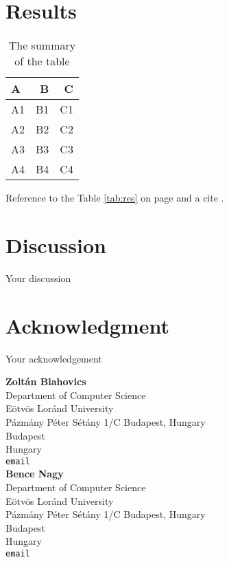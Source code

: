 \documentclass[10pt,leqno,twoside]{article}
\begin{document}
\section{Results}
\begin{table}[ht]
\centering
\begin{tabular}{lrr}
\toprule
A & B & C \\
\midrule
A1 & B1 & C1\\
A2 & B2 & C2\\
A3 & B3 & C3\\
A4 & B4 & C4\\
\bottomrule
\end{tabular}
\caption{\label{tab:train}The summary of the table}
\end{table}

Reference to the Table \ref{tab:res} on page \pageref{tab:res} and a cite \cite{reversing}.



\section{Discussion} %
Your discussion

\section*{Acknowledgment}
Your acknowledgement

\printbibliography[title=References]


\clearpage
\vspace{2cm}

\noindent\textbf{Zoltán Blahovics}\\
Department of Computer Science\\Eötvös Loránd University\\Pázmány Péter Sétány 1/C Budapest, Hungary\\
Budapest\\
Hungary\\
{\tt email}\\

\noindent\textbf{Bence Nagy}\\
Department of Computer Science\\Eötvös Loránd University\\Pázmány Péter Sétány 1/C Budapest, Hungary\\
Budapest\\
Hungary\\
{\tt email}\\
\end{document}
